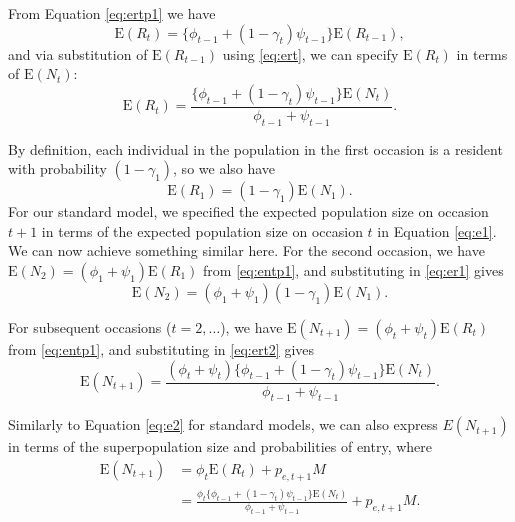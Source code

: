 \documentclass{article}
\newcommand{\E}[1]{\mathrm{E}(#1)}
\begin{document}
From Equation \eqref{eq:ertp1} we have
\begin{equation}
  \E{R_t} = \{ \phi_{t - 1} + (1 - \gamma_t) \psi_{t - 1}\} \E{R_{t - 1}}, \nonumber
\end{equation}
and via substitution of $\E{R_{t - 1}}$ using \eqref{eq:ert}, we can
specify $\E{R_t}$ in terms of $\E{N_t}$:
\begin{equation}
  \E{R_t} = \frac{\{ \phi_{t - 1} + (1 - \gamma_t) \psi_{t - 1}\}
    \E{N_t}}{\phi_{t - 1} + \psi_{t - 1}}. \label{eq:ert2}
\end{equation}

By definition, each individual in the population in the first occasion
is a resident with probability $(1 - \gamma_1)$, so we also have
\begin{equation}
\E{R_1} = (1 - \gamma_1) \E{N_1}. \label{eq:er1}
\end{equation}
For our standard model, we specified the expected population size on
occasion $t + 1$ in terms of the expected population size on occasion
$t$ in Equation \eqref{eq:e1}. We can now achieve something similar
here. For the second occasion, we have
$\E{N_2} = (\phi_1 + \psi_1) \E{R_1}$ from \eqref{eq:entp1}, and
substituting in \eqref{eq:er1} gives
\begin{equation}
  \E{N_2}  = (\phi_1 + \psi_1) (1 - \gamma_1) \E{N_1}. \label{eq:EN2t}
\end{equation}

For subsequent occasions ($t = 2, \ldots$), we have $\E{N_{t + 1}} =
(\phi_t + \psi_t) \E{R_t}$ from \eqref{eq:entp1}, and substituting in
\eqref{eq:ert2} gives
\begin{equation}
  \E{N_{t + 1}} = \frac{(\phi_t + \psi_t) \{ \phi_{t - 1} + (1 - \gamma_t) \psi_{t - 1}\}
    \E{N_t}}{\phi_{t - 1} + \psi_{t - 1}}. \label{eq:entp1n1}
\end{equation}

Similarly to Equation \eqref{eq:e2} for standard models, we can also
express $E(N_{t + 1})$ in terms of the superpopulation size and
probabilities of entry, where
\begin{align}
  \E{N_{t + 1}} &= \phi_t \E{R_t} + p_{e, t + 1}M \\
                &= \frac{\phi_t \{ \phi_{t - 1} + (1 - \gamma_t) \psi_{t - 1}\}
                  \E{N_t}}{\phi_{t - 1} + \psi_{t - 1}} + p_{e, t + 1}M. \label{eq:entp1n2}
\end{align}
\end{document}
